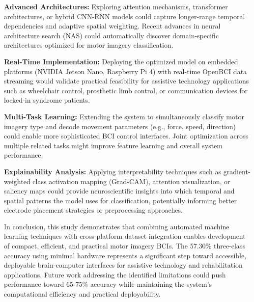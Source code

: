 \textbf{Advanced Architectures:} Exploring attention mechanisms, transformer architectures, or hybrid CNN-RNN models could capture longer-range temporal dependencies and adaptive spatial weighting. Recent advances in neural architecture search (NAS) could automatically discover domain-specific architectures optimized for motor imagery classification.

\textbf{Real-Time Implementation:} Deploying the optimized model on embedded platforms (NVIDIA Jetson Nano, Raspberry Pi 4) with real-time OpenBCI data streaming would validate practical feasibility for assistive technology applications such as wheelchair control, prosthetic limb control, or communication devices for locked-in syndrome patients.

\textbf{Multi-Task Learning:} Extending the system to simultaneously classify motor imagery type and decode movement parameters (e.g., force, speed, direction) could enable more sophisticated BCI control interfaces. Joint optimization across multiple related tasks might improve feature learning and overall system performance.

\textbf{Explainability Analysis:} Applying interpretability techniques such as gradient-weighted class activation mapping (Grad-CAM), attention visualization, or saliency maps could provide neuroscientific insights into which temporal and spatial patterns the model uses for classification, potentially informing better electrode placement strategies or preprocessing approaches.

In conclusion, this study demonstrates that combining automated machine learning techniques with cross-platform dataset integration enables development of compact, efficient, and practical motor imagery BCIs. The 57.30\% three-class accuracy using minimal hardware represents a significant step toward accessible, deployable brain-computer interfaces for assistive technology and rehabilitation applications. Future work addressing the identified limitations could push performance toward 65-75\% accuracy while maintaining the system's computational efficiency and practical deployability.

